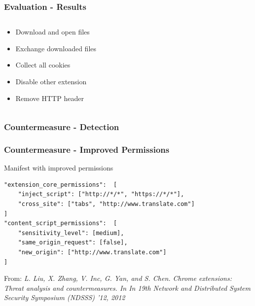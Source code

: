 \documentclass[accentcolor=tud9c,colorbacktitle,xcolor=dvipsnames]{tudbeamer}
\newcommand{\highlight}[4]{%
	\ifnum\value{lstnumber}=#1\color{orange!30}\fi%
	\ifnum\value{lstnumber}=#2\color{orange!30}\fi%
	\ifnum\value{lstnumber}=#3\color{orange!30}\fi%
	\ifnum\value{lstnumber}=#4\color{orange!30}\fi%
}
\begin{document}
\begin{frame}[fragile]
    \frametitle{Evaluation - Results}
    \begin{columns}[T]
        \begin{column}[T]{0.4\textwidth}
            \begin{itemize}
                \itemsep1.5em
                \item Download and open files
                \item Exchange downloaded files
                \item Collect all cookies
                \item Disable other extension
                \item Remove HTTP header
            \end{itemize}
        \end{column}
        \begin{column}[T]{0.5\textwidth}
        \end{column}
    \end{columns}
\end{frame}

\begin{frame}
    \frametitle{Countermeasure - Detection}
\end{frame}

\begin{frame}[fragile]
    \frametitle{Countermeasure - Improved Permissions}
    \begin{block}{Manifest with improved permissions}
        \begin{lstlisting}[linebackgroundcolor={\highlight{1}{5}{0}{0}}]
"extension_core_permissions":  [
    "inject_script": ["http://*/*", "https://*/*"],
    "cross_site": ["tabs", "http://www.translate.com"]
]
"content_script_permissions":  [
    "sensitivity_level": [medium],
    "same_origin_request": [false],
    "new_origin": ["http://www.translate.com"]
]
\end{lstlisting}
    \end{block}
    \begin{footnotesize}
        From: \textit{L. Liu, X. Zhang, V. Inc, G. Yan, and S. Chen. Chrome extensions: Threat analysis and countermeasures. In In 19th Network and Distributed System Security Symposium (NDSSS) ’12, 2012}
    \end{footnotesize}
\end{frame}
\end{document}

